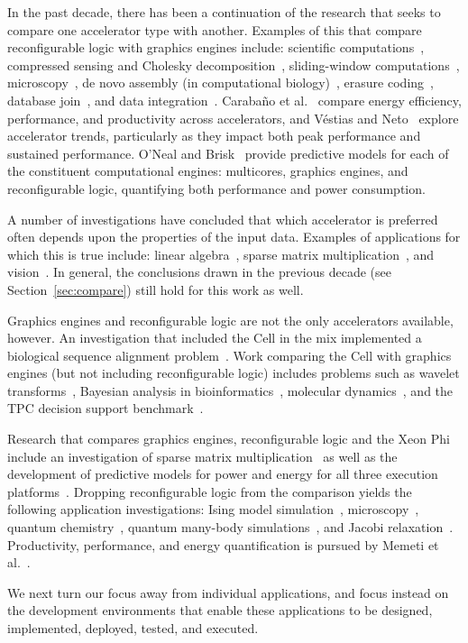In the past decade, there has been a continuation of the research that
seeks to compare one accelerator type with another. Examples of this
that compare reconfigurable logic with graphics engines include:
scientific computations~\cite{wghp11},
compressed sensing and Cholesky decomposition~\cite{ypl12},
sliding-window computations~\cite{cfbs15},
microscopy~\cite{tzwz15},
de novo assembly (in computational biology)~\cite{mjk+16},
erasure coding~\cite{czs+16},
database join~\cite{rl17},
and data integration~\cite{fcb+19}.
Caraba\~no et al.~\cite{cdde13} compare
energy efficiency, performance, and productivity across accelerators, and
V\'{e}stias and Neto~\cite{vn14} explore accelerator trends, particularly
as they impact both peak performance and sustained performance.
O'Neal and Brisk~\cite{ob18} provide predictive models for each of the
constituent
computational engines: multicores, graphics engines, and reconfigurable
logic, quantifying both performance and power consumption.

A number of investigations have concluded that which accelerator
is preferred often depends upon the properties of the input data.
Examples of applications for which this is true include:
linear algebra~\cite{gchg16,sll+13},
sparse matrix multiplication~\cite{gsbh16},
and vision~\cite{mfo+16}.
In general, the conclusions drawn in the previous decade (see
Section~\ref{sec:compare}) still hold for this work as well.

Graphics engines and reconfigurable logic are not the only accelerators
available, however.  An investigation that included the Cell in
the mix implemented a biological sequence alignment problem~\cite{bal+12}.
Work comparing the Cell with graphics engines (but not including
reconfigurable logic) includes problems such as
wavelet transforms~\cite{bck+11},
Bayesian analysis in bioinformatics~\cite{pts+12},
molecular dynamics~\cite{pts+12}, and the TPC decision support
benchmark~\cite{pts+12}.

Research that compares graphics engines, reconfigurable logic and
the Xeon Phi include an investigation of
sparse matrix multiplication~\cite{gsbh16} as well as the development of
predictive models for power and energy for all three
execution platforms~\cite{opr+17}.
Dropping reconfigurable logic from the comparison yields the following
application investigations:
Ising model simulation~\cite{ws13},
microscopy~\cite{tkk+14},
quantum chemistry~\cite{lrg14},
quantum many-body simulations~\cite{Lyakh15}, and
Jacobi relaxation~\cite{cv16}.
Productivity, performance, and energy quantification is pursued
by Memeti et al.~\cite{mlp+17}.

We next turn our focus away from individual applications, and focus
instead on the development environments that enable these applications
to be designed, implemented, deployed, tested, and executed.
